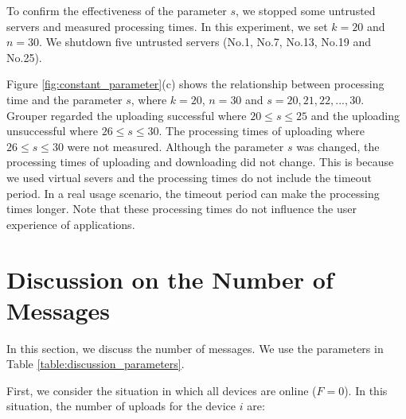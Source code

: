 \documentclass[a4paper,11pt]{report}
\begin{document}
To confirm the effectiveness of the parameter $s$, we stopped some untrusted servers and measured processing times.
In this experiment, we set $k = 20$ and $n = 30$.
We shutdown five untrusted servers (No.1, No.7, No.13, No.19 and No.25).

Figure \ref{fig:constant_parameter}(c) shows the relationship between processing time and the parameter $s$, where $k = 20$, $n = 30$ and $s = 20, 21, 22, ... , 30$.
Grouper regarded the uploading successful where $20 \leq s \leq 25$ and the uploading unsuccessful where $26 \leq s \leq 30$.
The processing times of uploading where $26 \leq s \leq 30$ were not measured.
Although the parameter $s$  was changed, the processing times of uploading and downloading did not change.
This is because we used virtual severs and the processing times do not include the timeout period.
In a real usage scenario, the timeout period can make the processing times longer. 
Note that these processing times do not influence the user experience of applications.

\section{Discussion on the Number of Messages} \label{section:discussion}

In this section, we discuss the number of messages. 
We use the parameters in Table \ref{table:discussion_parameters}.

First, we consider the situation in which all devices are online ($F=0$).
In this situation, the number of uploads for the device $i$ are:
\end{document}
